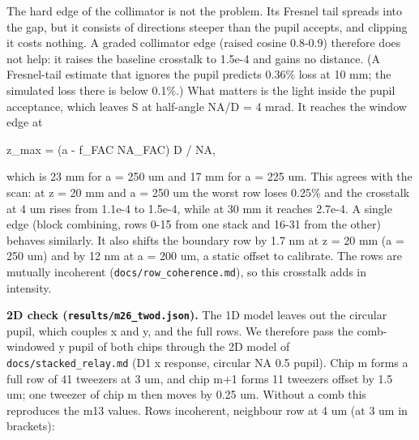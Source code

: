 The hard edge of the collimator is not the problem. Its Fresnel tail
spreads into the gap, but it consists of directions steeper than the
pupil accepts, and clipping it costs nothing. A graded collimator edge
(raised cosine 0.8-0.9) therefore does not help: it raises the baseline
crosstalk to 1.5e-4 and gains no distance. (A Fresnel-tail estimate that
ignores the pupil predicts 0.36\% loss at 10 mm; the simulated loss
there is below 0.1\%.) What matters is the light inside the pupil
acceptance, which leaves S at half-angle NA/D = 4 mrad. It reaches the
window edge at

z\_max = (a - f\_FAC NA\_FAC) D / NA,

which is 23 mm for a = 250 um and 17 mm for a = 225 um. This agrees with
the scan: at z = 20 mm and a = 250 um the worst row loses 0.25\% and the
crosstalk at 4 um rises from 1.1e-4 to 1.5e-4, while at 30 mm it reaches
2.7e-4. A single edge (block combining, rows 0-15 from one stack and
16-31 from the other) behaves similarly. It also shifts the boundary row
by 1.7 nm at z = 20 mm (a = 250 um) and by 12 nm at a = 200 um, a static
offset to calibrate. The rows are mutually incoherent
(\texttt{docs/row\_coherence.md}), so this crosstalk adds in intensity.

\textbf{2D check (\texttt{results/m26\_twod.json}).} The 1D model leaves
out the circular pupil, which couples x and y, and the full rows. We
therefore pass the comb-windowed y pupil of both chips through the 2D
model of \texttt{docs/stacked\_relay.md} (D1 x response, circular NA 0.5
pupil). Chip m forms a full row of 41 tweezers at 3 um, and chip m+1
forms 11 tweezers offset by 1.5 um; one tweezer of chip m then moves by
0.25 um. Without a comb this reproduces the m13 values. Rows incoherent,
neighbour row at 4 um (at 3 um in brackets):

